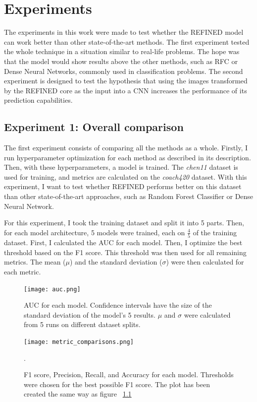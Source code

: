 \chapter{Experiments}
\label{experiments}

The experiments in this work were made to test whether the REFINED model can work better than other state-of-the-art methods. The first experiment tested the whole technique in a situation similar to real-life problems. The hope was that the model would show results above the other methods, such as \ac{RFC} or Dense Neural Networks, commonly used in classification problems. The second experiment is designed to test the hypothesis that using the images transformed by the REFINED core as the input into a \ac{CNN} increases the performance of its prediction capabilities.

\section{Experiment 1: Overall comparison}
\label{first_experiment}

The first experiment consists of comparing all the methods as a whole. Firstly, I run hyperparameter optimization for each method as described in its description. Then, with these hyperparameters, a model is trained. The \textit{chen11} dataset is used for training, and metrics are calculated on the \textit{coach420} dataset. With this experiment, I want to test whether REFINED performs better on this dataset than other state-of-the-art approaches, such as Random Forest Classifier or Dense Neural Network.

For this experiment, I took the training dataset and split it into 5 parts. Then, for each model architecture, 5 models were trained, each on $\frac{4}{5}$ of the training dataset. First, I calculated the AUC for each model. Then, I optimize the best threshold based on the F1 score. This threshold was then used for all remaining metrics. The mean ($\mu$) and the standard deviation ($\sigma$) were then calculated for each metric. 
   
\begin{figure}
    \centering
    \texttt{[image: auc.png]}
    \caption{AUC for each model. Confidence intervals have the size of the standard deviation of the model's 5 results. $\mu$ and $\sigma$ were calculated from 5 runs on different dataset splits.}
    \label{fig:auc}
\end{figure}

\begin{figure}
    \centering
    \texttt{[image: metric\_comparisons.png]}
    \caption{F1 score, Precision, Recall, and Accuracy for each model. Thresholds were chosen for the best possible F1 score. The plot has been created the same way as figure ~\ref{fig:auc}}.
    \label{fig:f1_et_al}
\end{figure}

